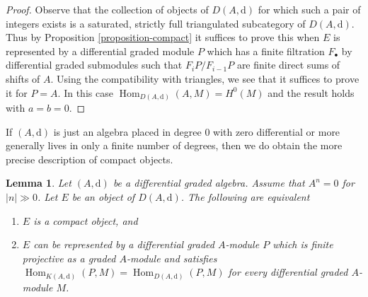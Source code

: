 \documentclass{stacks-project}
\theoremstyle{plain}
\newtheorem{lemma}[subsection]{Lemma}
\theoremstyle{definition}
\theoremstyle{remark}
\numberwithin{equation}{subsection}
\def\Hom{\mathop{\mathrm{Hom}}\nolimits}
\begin{document}
\begin{proof}
Observe that the collection of objects of $D(A, \text{d})$ for which
such a pair of integers exists is a saturated, strictly full triangulated
subcategory of $D(A, \text{d})$.
Thus by Proposition \ref{proposition-compact} it suffices to prove
this when $E$ is represented by a differential graded module $P$ which
has a finite filtration $F_\bullet$ by differential graded submodules
such that $F_iP/F_{i - 1}P$ are finite direct sums of shifts of $A$.
Using the compatibility with triangles, we see that it suffices
to prove it for $P = A$. In this case $\Hom_{D(A, \text{d})}(A, M) = H^0(M)$
and the result holds with $a = b = 0$.
\end{proof}

\noindent
If $(A, \text{d})$ is just an algebra placed in degree $0$
with zero differential or more generally lives in
only a finite number of degrees, then we do obtain the
more precise description of compact objects.

\begin{lemma}
\label{lemma-compact}
Let $(A, \text{d})$ be a differential graded algebra. Assume that $A^n = 0$
for $|n| \gg 0$. Let $E$ be an object of $D(A, \text{d})$.
The following are equivalent
\begin{enumerate}
\item $E$ is a compact object, and
\item $E$ can be represented by a differential graded $A$-module $P$
which is finite projective as a graded $A$-module and satisfies
$\Hom_{K(A, \text{d})}(P, M) = \Hom_{D(A, \text{d})}(P, M)$
for every differential graded $A$-module $M$.
\end{enumerate}
\end{lemma}
\end{document}
